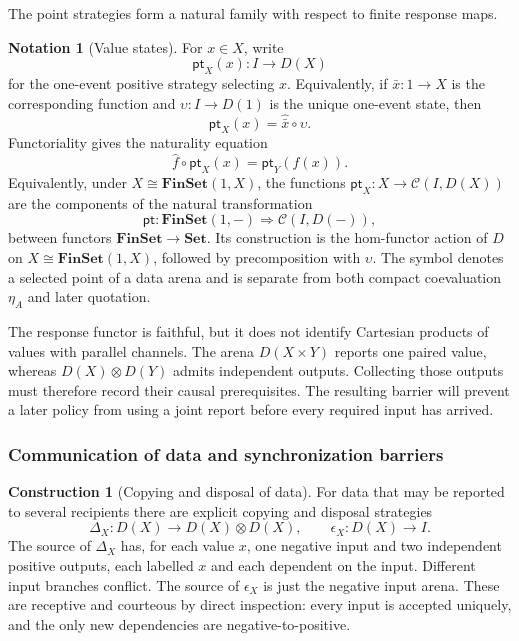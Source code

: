 \documentclass[11pt,a4paper]{article}
\numberwithin{equation}{section}
\theoremstyle{definition}
\newtheorem{construction}[construction]{Construction}
\newtheorem{notation}[theorem]{Notation}
\theoremstyle{remark}
\theoremstyle{plain}
\begin{document}
\noindent The point strategies form a natural family with respect to finite response maps.
\begin{center}
\end{center}

\begin{notation}[Value states]
For $x\in X$, write
\[
 \mathsf{pt}_X(x):I\longrightarrow D(X)
\]
for the one-event positive strategy selecting $x$. Equivalently, if
$\bar x:1\to X$ is the corresponding function and
$\upsilon:I\to D(1)$ is the unique one-event state, then
\[
 \mathsf{pt}_X(x)=\widehat{\bar x}\circ\upsilon.
\]
Functoriality gives the naturality equation
\begin{equation}
\label{eq:egt-value-state-naturality}
 \widehat f\circ\mathsf{pt}_X(x)
 =\mathsf{pt}_Y(f(x)).
\end{equation}
Equivalently, under $X\cong\mathbf{FinSet}(1,X)$, the functions
$\mathsf{pt}_X:X\to\mathcal C(I,D(X))$ are the components of the
natural transformation
\[
 \mathsf{pt}:\mathbf{FinSet}(1,-)
 \Longrightarrow \mathcal C(I,D(-)),
\]
between functors $\mathbf{FinSet}\to\mathbf{Set}$.
Its construction is the hom-functor action of $D$ on
$X\cong\mathbf{FinSet}(1,X)$, followed by precomposition with
$\upsilon$. The symbol denotes a selected point of a data arena and is
separate from both compact coevaluation $\eta_A$ and later quotation.
\end{notation}

The response functor is faithful, but it does not identify Cartesian
products of values with parallel channels. The arena $D(X\times Y)$ reports
one paired value, whereas $D(X)\otimes D(Y)$ admits independent outputs.
Collecting those outputs must therefore record their causal prerequisites.
The resulting barrier will prevent a later policy from using a joint report
before every required input has arrived.

\subsubsection{Communication of data and synchronization barriers}

\begin{construction}[Copying and disposal of data]
For data that may be reported to several recipients there are explicit
copying and disposal strategies
\[
 \Delta_X:D(X)\to D(X)\otimes D(X),\qquad
 \epsilon_X:D(X)\to I.
\]
The source of $\Delta_X$ has, for each value $x$, one negative input
and two independent positive outputs, each labelled $x$ and each
dependent on the input. Different input branches conflict. The source
of $\epsilon_X$ is just the negative input arena. These are receptive
and courteous by direct inspection: every input is accepted uniquely,
and the only new dependencies are negative-to-positive.
\end{construction}
\end{document}
